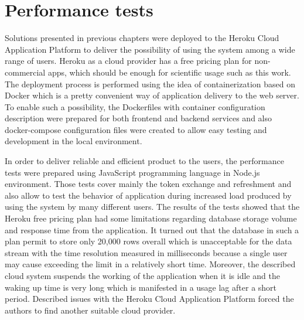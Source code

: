 \section{Performance tests}\label{sec:performance-tests}
Solutions presented in previous chapters were deployed to the Heroku Cloud Application Platform to deliver the possibility of using the system among a wide range of users.
Heroku as a cloud provider has a free pricing plan for non-commercial apps, which should be enough for scientific usage such as this work.
The deployment process is performed using the idea of containerization based on Docker which is a pretty convenient way of application delivery to the web server.
To enable such a possibility, the \mbox{Dockerfiles} with container configuration description were prepared for both frontend and backend services and also docker-compose configuration files were created to allow easy testing and development in the local environment.

In order to deliver reliable and efficient product to the users, the performance tests were prepared using JavaScript programming language in Node.js environment.
Those tests cover mainly the token exchange and refreshment and also allow to test the behavior of application during increased load produced by using the system by many different users.
The results of the tests showed that the Heroku free pricing plan had some limitations regarding database storage volume and response time from the application.
It turned out that the database in such a plan permit to store only 20,000 rows overall which is unacceptable for the data stream with the time resolution measured in milliseconds because a single user may cause exceeding the limit in a relatively short time.
Moreover, the described cloud system suspends the working of the application when it is idle and the waking up time is very long which is manifested in a usage lag after a short period.
Described issues with the Heroku Cloud Application Platform forced the authors to find another suitable cloud provider.